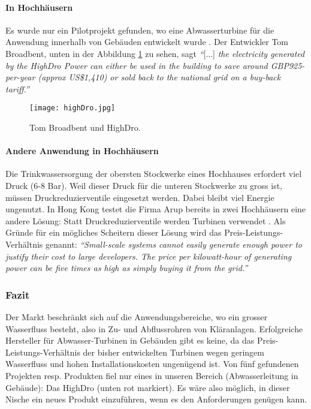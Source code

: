 \paragraph{In Hochhäusern}
Es wurde nur ein Pilotprojekt gefunden, wo eine Abwasserturbine für die Anwendung innerhalb von Gebäuden entwickelt wurde \cite{newatlas}. Der Entwickler Tom Broadbent, unten in der Abbildung \ref{fig:turbineTomBroadBent} zu sehen, sagt \textit{``}[...] \textit{the electricity generated by the HighDro Power can either be used in the building to save around GBP925-per-year (approx US\$1,410) or sold back to the national grid on a buy-back tariff.''} \cite{newatlas}
\newpage
\begin{figure}
\centering
\texttt{[image: highDro.jpg]}
\caption{Tom Broadbent und HighDro. \cite{newatlas}}
\label{fig:turbineTomBroadBent}
\end{figure}
\paragraph{Andere Anwendung in Hochhäusern}
Die Trinkwassersorgung der obersten Stockwerke eines Hochhauses erfordert viel Druck (6-8 Bar). Weil dieser Druck für die unteren Stockwerke zu gross ist, müssen Druckreduzierventile eingesetzt werden. Dabei bleibt viel Energie ungenutzt. In Hong Kong testet die Firma Arup bereits in zwei Hochhäusern eine andere Lösung: Statt Druckreduzierventile werden Turbinen verwendet \cite{nytimes}. Als Gründe für ein mögliches Scheitern dieser Lösung wird das Preis-Leistungs-Verhältnis genannt:
\textit{``Small-scale systems cannot easily generate enough power to justify their cost to large developers. The price per kilowatt-hour of generating power can be five times as high as simply buying it from the grid.''}\cite{nytimes}
\subsubsection{Fazit}
Der Markt beschränkt sich auf die Anwendungsbereiche, wo ein grosser Wasserfluss besteht, also in Zu- und Abflussrohren von Kläranlagen. Erfolgreiche Hersteller für Abwasser-Turbinen in Gebäuden gibt es keine, da das Preis-Leistungs-Verhältnis der bisher entwickelten Turbinen wegen geringem Wasserfluss und hohen Installationskosten ungenügend ist. Von fünf gefundenen Projekten resp. Produkten fiel nur eines in unseren Bereich (Abwasserleitung in Gebäude): Das HighDro (unten rot markiert). Es wäre also möglich, in dieser Nische ein neues Produkt einzuführen, wenn es den Anforderungen genügen kann.

